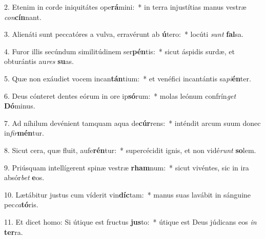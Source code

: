 2. Etenim in corde iniquitátes ope\textbf{rá}mini:~*  in terra injustítias manus vestræ \textit{con}\textbf{cín}nant.\

3. Alienáti sunt peccatóres a vulva, erravérunt ab \textbf{ú}tero:~*  locúti \textit{sunt} \textbf{fal}sa.\

4. Furor illis secúndum similitúdinem ser\textbf{pén}tis:~*  sicut áspidis surdæ, et obturántis au\textit{res} \textbf{su}as.\

5. Quæ non exáudiet vocem incan\textbf{tán}tium:~*  et venéfici incantántis sa\textit{pi}\textbf{én}ter.\

6. Deus cónteret dentes eórum in ore ip\textbf{só}rum:~*  molas leónum confrín\textit{get} \textbf{Dó}minus.\

7. Ad níhilum devénient tamquam aqua de\textbf{cúr}rens:~*  inténdit arcum suum donec in\textit{fir}\textbf{mén}tur.\

8. Sicut cera, quæ fluit, aufe\textbf{rén}tur:~*  supercécidit ignis, et non vidé\textit{runt} \textbf{so}lem.\

9. Priúsquam intellígerent spinæ vestræ \textbf{rham}num:~*  sicut vivéntes, sic in ira absór\textit{bet} \textbf{e}os.\

10. Lætábitur justus cum víderit vin\textbf{díc}tam:~*  manus suas lavábit in sánguine pec\textit{ca}\textbf{tó}ris.\

11. Et dicet homo: Si útique est fructus \textbf{jus}to:~*  útique est Deus júdicans eos \textit{in} \textbf{ter}ra.\

